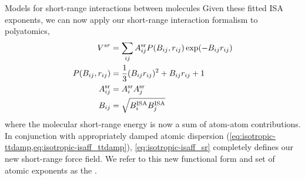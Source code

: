 \begin{subsection}{Models for short-range interactions between molecules}
Given these fitted ISA exponents, we can now apply
our short-range interaction formalism to polyatomics,
%
\begin{align}
\label{eq:isotropic-isaff_sr}
\begin{split}
V^{sr} &= \sum\limits_{ij} A^{\text{sr}}_{ij} P(B_{ij}, r_{ij}) \exp(-B_{ij}r_{ij}) \\
P(B_{ij},r_{ij}) &= \frac13 (B_{ij} r_{ij})^2 + B_{ij} r_{ij} + 1 \\
    A^{\text{sr}}_{ij} &= A^{\text{sr}}_{i}A^{\text{sr}}_{j} \\
    B_{ij} &= \sqrt{B^{\text{ISA}}_{i}B^{\text{ISA}}_{j}} \\
\end{split}
\end{align}
%
where the molecular
short-range energy is now a sum of atom-atom contributions. In conjunction
with appropriately damped atomic dispersion (\cref{eq:isotropic-ttdamp,eq:isotropic-isaff_ttdamp}), \cref{eq:isotropic-isaff_sr}  completely defines our new
short-range force field. We refer to this new functional form and set of atomic
exponents as the \isaff.

\end{subsection}
